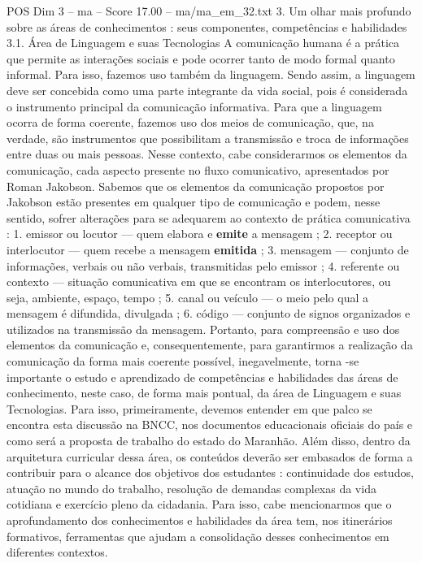 \begin{textsample}{POS Dim 3 – ma – Score 17.00 – ma/ma\_em\_32.txt}  \label{ex:f3_pos_148}
3.
Um olhar mais profundo sobre as áreas de conhecimentos : seus componentes, competências e habilidades 3.1.
Área de Linguagem e suas Tecnologias A comunicação humana é a prática que permite as interações sociais e pode ocorrer tanto de modo formal quanto informal.
Para isso, fazemos uso também da linguagem.
Sendo assim, a linguagem deve ser concebida como uma parte integrante da vida social, pois é considerada o instrumento principal da comunicação informativa.
Para que a linguagem ocorra de forma coerente, fazemos uso dos meios de comunicação, que, na verdade, são instrumentos que possibilitam a transmissão e troca de informações entre duas ou mais pessoas.
Nesse contexto, cabe considerarmos os elementos da comunicação, cada aspecto presente no fluxo comunicativo, apresentados por Roman Jakobson.
Sabemos que os elementos da comunicação propostos por Jakobson estão presentes em qualquer tipo de comunicação e podem, nesse sentido, sofrer alterações para se adequarem ao contexto de prática comunicativa : 1. emissor ou locutor — quem elabora e \textbf{emite} a mensagem ; 2. receptor ou interlocutor — quem recebe a mensagem \textbf{emitida} ; 3. mensagem — conjunto de informações, verbais ou não verbais, transmitidas pelo emissor ; 4. referente ou contexto — situação comunicativa em que se encontram os interlocutores, ou seja, ambiente, espaço, tempo ; 5. canal ou veículo — o meio pelo qual a mensagem é difundida, divulgada ; 6. código — conjunto de signos organizados e utilizados na transmissão da mensagem.
Portanto, para compreensão e uso dos elementos da comunicação e, consequentemente, para garantirmos a realização da comunicação da forma mais coerente possível, inegavelmente, torna -se importante o estudo e aprendizado de competências e habilidades das áreas de conhecimento, neste caso, de forma mais pontual, da área de Linguagem e suas Tecnologias.
Para isso, primeiramente, devemos entender em que palco se encontra esta discussão na BNCC, nos documentos educacionais oficiais do país e como será a proposta de trabalho do estado do Maranhão.
Além disso, dentro da arquitetura curricular dessa área, os conteúdos deverão ser embasados de forma a contribuir para o alcance dos objetivos dos estudantes : continuidade dos estudos, atuação no mundo do trabalho, resolução de demandas complexas da vida cotidiana e exercício pleno da cidadania.
Para isso, cabe mencionarmos que o aprofundamento dos conhecimentos e habilidades da área tem, nos itinerários formativos, ferramentas que ajudam a consolidação desses conhecimentos em diferentes contextos.

\end{textsample}

